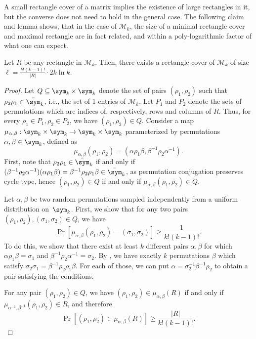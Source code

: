 A small rectangle cover of a matrix implies the existence of large rectangles in it, but the converse does not need to hold in the general case. The following claim and lemma shows, that in the case of $\mathcal{M}_k$, the size of a minimal rectangle cover and maximal rectangle are in fact related, and within a poly-logarithmic factor of what one can expect.

\begin{claim}\label{clm:mm_rect_cover_duality}
    Let $R$ be any rectangle in $\mathcal{M}_k$. Then, there exists a rectangle cover of $\mathcal{M}_k$ of size $\ell = \frac{k!(k - 1)!}{|R|} \cdot 2k \ln k$.
\end{claim}

\begin{proof}
    Let $Q \subseteq \sym_k \times \sym_k$ denote the set of pairs $(\rho_1, \rho_2)$ such that $\rho_2\rho_1 \in \bar\sym_k$, i.e., the set of 1-entries of $\mathcal{M}_k$. Let $P_1$ and $P_2$ denote the sets of permutations which are indices of, respectively, rows and columns of $R$. Thus, for every $\rho_1 \in P_1, \rho_2 \in P_2$, we have $(\rho_1, \rho_2) \in Q$.
    Consider a map $\mu_{\alpha, \beta} : \sym_k \times \sym_k \to \sym_k \times \sym_k$ parameterized by permutations $\alpha, \beta \in \sym_k$, defined as
    $$
        \mu_{\alpha, \beta} (\rho_1, \rho_2) =
        (\alpha \rho_1 \beta, \beta^{-1} \rho_2 \alpha^{-1}).
    $$
    First, note that $\rho_2 \rho_1 \in \bar\sym_k$ if and only if $(\beta^{-1}\rho_2\alpha^{-1}) (\alpha \rho_1 \beta) = \beta^{-1} \rho_2 \rho_1 \beta \in \bar\sym_k$, as permutation conjugation preserves cycle type, hence $(\rho_1, \rho_2) \in Q$ if and only if $\mu_{\alpha, \beta}(\rho_1, \rho_2) \in Q$.

    Let $\alpha, \beta$ be two random permutations sampled independently from a uniform distribution on~$\sym_k$. First, we show that for any two pairs $(\rho_1, \rho_2), (\sigma_1, \sigma_2) \in Q$, we have
    $$
    \Pr[\mu_{\alpha, \beta}(\rho_1, \rho_2) = (\sigma_1, \sigma_2)] \geq \frac{1}{k!(k - 1)!}.
    $$
    To do this, we show that there exist at least $k$ different pairs $\alpha, \beta$ for which $\alpha \rho_1 \beta = \sigma_1$ and $\beta^{-1} \rho_2 \alpha^{-1} = \sigma_2$. By , we have exactly $k$ permutations $\beta$ which satisfy $\sigma_2 \sigma_1 = \beta^{-1} \rho_2 \rho_1 \beta$. For each of those, we can put $\alpha = \sigma_2^{-1} \beta^{-1} \rho_2$ to obtain a pair satisfying the conditions.

    For any pair $(\rho_1, \rho_2) \in Q$, we have $(\rho_1, \rho_2) \in \mu_{\alpha, \beta}(R)$ if and only if $\mu_{\alpha^{-1}, \beta^{-1}}(\rho_1, \rho_2) \in R$, and therefore
    $$
    \Pr[(\rho_1, \rho_2) \in \mu_{\alpha, \beta}(R)] \geq \frac{|R|}{k!(k - 1)!}.
    $$


\end{proof}
